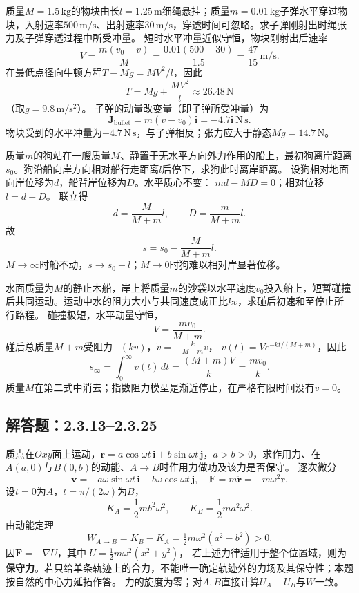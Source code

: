 \problemtext 质量$M=1.5\,\mathrm{kg}$的物块由长$l=1.25\,\mathrm m$细绳悬挂；质量$m=0.01\,\mathrm{kg}$子弹水平穿过物块，入射速率$500\,\mathrm{m/s}$、出射速率$30\,\mathrm{m/s}$，穿透时间可忽略。求子弹刚射出时绳张力及子弹穿透过程中所受冲量。
\workings
短时水平冲量近似守恒，物块刚射出后速率
\[
V=\frac{m(v_0-v)}{M}
=\frac{0.01(500-30)}{1.5}=\frac{47}{15}\,\mathrm{m/s}.
\]
在最低点径向牛顿方程$T-Mg=MV^2/l$，因此
\[
\boxed{T=Mg+\frac{MV^2}{l}\approx26.48\,\mathrm N}
\]
（取$g=9.8\,\mathrm{m/s^2}$）。
子弹的动量改变量（即子弹所受冲量）为
\[
\boxed{\bm J_{\mathrm{bullet}}=m(v-v_0)\bm i=-4.7\bm i\ \mathrm{N\,s}}.
\]
\crosscheck 物块受到的水平冲量为$+4.7\,\mathrm{N\,s}$，与子弹相反；张力应大于静态$Mg=14.7\,\mathrm N$。

\problemtext 质量$m$的狗站在一艘质量$M$、静置于无水平方向外力作用的船上，最初狗离岸距离$s_0$。狗沿船向岸方向相对船行走距离$l$后停下，求狗此时离岸距离。
\workings
设狗相对地面向岸位移为$d$，船背岸位移为$D$。水平质心不变：
$md-MD=0$；相对位移$l=d+D$。
联立得
\[
d=\frac{M}{M+m}l,\qquad D=\frac{m}{M+m}l.
\]
故
\[
\boxed{s=s_0-\frac{M}{M+m}l}.
\]
\crosscheck $M\to\infty$时船不动，$s\to s_0-l$；$M\to0$时狗难以相对岸显著位移。

\problemtext 水面质量为$M$的静止木船，岸上将质量$m$的沙袋以水平速度$v_0$投入船上，短暂碰撞后共同运动。运动中水的阻力大小与共同速度成正比$kv$，求碰后初速和至停止所行路程。
\workings
碰撞极短，水平动量守恒，
\[
\boxed{V=\frac{mv_0}{M+m}}.
\]
碰后总质量$M+m$受阻力$-(kv)$，$\dot v=-\frac{k}{M+m}v$，
$v(t)=Ve^{-kt/(M+m)}$，因此
\[
\boxed{s_\infty=\int_0^\infty v(t)\,dt
=\frac{(M+m)V}{k}=\frac{mv_0}{k}}.
\]
\crosscheck 质量$M$在第二式中消去；指数阻力模型是渐近停止，在严格有限时间没有$v=0$。


\subsection{解答题：2.3.13--2.3.25}

\problemtext 质点在$Oxy$面上运动，$\bm r=a\cos\omega t\,\bm i+b\sin\omega t\,\bm j$，$a>b>0$，求作用力、在$A(a,0)$与$B(0,b)$的动能、$A\to B$时作用力做功及该力是否保守。
\workings
逐次微分
\[
\bm v=-a\omega\sin\omega t\,\bm i+b\omega\cos\omega t\,\bm j,
\quad
\bm F=m\ddot{\bm r}=-m\omega^2\bm r.
\]
设$t=0$为$A$，$t=\pi/(2\omega)$为$B$，
\[
\boxed{K_A=\frac12m b^2\omega^2},\qquad
\boxed{K_B=\frac12m a^2\omega^2}.
\]
由动能定理
\[
\boxed{W_{A\to B}=K_B-K_A
=\tfrac12m\omega^2(a^2-b^2)>0}.
\]
因$\bm F=-\nabla U$，其中
$U=\frac12m\omega^2(x^2+y^2)$，
若上述力律适用于整个位置域，则为\textbf{保守力}。若只给单条轨迹上的合力，不能唯一确定轨迹外的力场及其保守性；本题按自然的中心力延拓作答。
\crosscheck 力的旋度为零；对$A,B$直接计算$U_A-U_B$与$W$一致。

